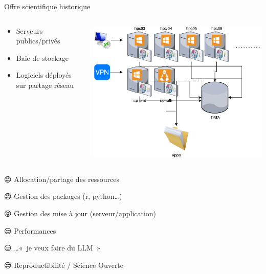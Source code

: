 \documentclass[
  12pt,
  ignorenonframetext,
  aspectratio=169,
  french,
  aspectratio=169]{beamer}
\begin{document}
\begin{frame}{Offre scientifique historique}
\label{offre-scientifique-historique}
\begin{columns}[T]
\begin{column}{0.48\linewidth}
\begin{itemize}
\item
  Serveurs publics/privés
\item
  Baie de stockage
\item
  Logiciels déployés sur partage réseau
\end{itemize}
\end{column}

\begin{column}{0.48\linewidth}
\includegraphics[width=\linewidth,height=0.4\textheight,keepaspectratio]{img/offre-hpc-genes.drawio.png}
\end{column}
\end{columns}

\begin{block}{}
\label{section}
😡 Allocation/partage des ressources

😡 Gestion des packages (r, python\ldots)

😡 Gestion des mise à jour (serveur/application)

😑 Performances

😑 \ldots«~je veux faire du LLM~»

😑 Reproductibilité / Science Ouverte
\end{block}
\end{frame}
\end{document}
